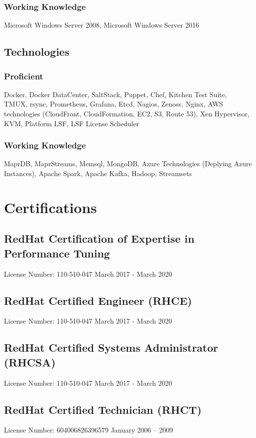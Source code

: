 \documentclass{article}
\begin{document}
    \subsubsection{Working Knowledge}
    Microsoft Windows Server 2008, Microsoft Windows Server 2016

  \subsection{Technologies}
    \subsubsection{Proficient}
      Docker, Docker DataCenter, SaltStack, Puppet, Chef, Kitchen Test Suite, TMUX, rsync, Prometheus, Grafana, Etcd, Nagios, Zenoss, Nginx, AWS technologies (CloudFront, CloudFormation, EC2, S3, Route 53), Xen Hypervisor, KVM, Platform LSF, LSF License Scheduler
    \subsubsection{Working Knowledge}
      MaprDB, MaprStreams, Memsql, MongoDB, Azure Technologies (Deplying Azure Instances), Apache Spark, Apache Kafka, Hadoop, Streamsets

\section{Certifications}
  \subsection{RedHat Certification of Expertise in Performance Tuning}
    License Number: 110-510-047 \hfill March 2017 - March 2020
  \subsection{RedHat Certified Engineer (RHCE)}
    License Number: 110-510-047 \hfill March 2017 - March 2020
  \subsection{RedHat Certified Systems Administrator (RHCSA)}
    License Number: 110-510-047 \hfill March 2017 - March 2020
  \subsection{RedHat Certified Technician (RHCT)}
    License Number: 604006826396579 \hfill January 2006 – 2009
    
\end{document}
